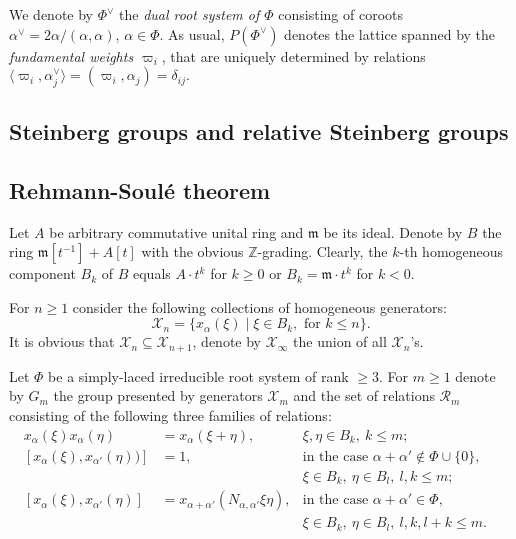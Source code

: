 \documentclass[oneside, 10pt]{amsart}
\newcommand{\XX}[1]{\mathcal{X}_{#1}}
\newcommand{\RR}[1]{\mathcal{R}_{#1}}
\numberwithin{equation}{section}
\numberwithin{lemma}{section}
\theoremstyle{definition}
\theoremstyle{remark}
\begin{document}
We denote by $\Phi^\vee$ the \emph{dual root system of $\Phi$} consisting of coroots $\alpha^\vee = 2\alpha/(\alpha, \alpha)$, $\alpha\in \Phi$.
As usual, $P(\Phi^\vee)$ denotes the lattice spanned by the \emph{fundamental weights $\varpi_i$},
 that are uniquely determined by relations $\langle\varpi_i, \alpha_j^\vee \rangle = (\varpi_i, \alpha_j) = \delta_{ij}.$ %

\subsection{Steinberg groups and relative Steinberg groups}

\subsection{Rehmann-Soul{\'e} theorem}

Let $A$ be arbitrary commutative unital ring and $\mathfrak{m}$ be its ideal.
Denote by $B$ the ring $\mathfrak{m}[t^{-1}] + A[t]$ with the obvious $\mathbb{Z}$-grading.
Clearly, the $k$-th homogeneous component $B_k$ of $B$ equals $A\cdot t^k$ for $k \geq 0$ or $B_k = \mathfrak{m} \cdot t^k$ for $k<0$.

For $n \geq 1$ consider the following collections of homogeneous generators:
\[\XX{n} = \{ x_\alpha(\xi) \mid \xi \in B_k,\text{ for } k\leq n\}. \]
It is obvious that $\XX{n} \subseteq \XX{n+1}$, denote by $\XX{\infty}$ the union of all $\XX{n}$'s.

Let $\Phi$ be a simply-laced irreducible root system of rank $\geq 3$.
For $m\geq 1$ denote by $G_m$ the group presented by generators $\mathcal{X}_m$ and the set of relations $\RR{m}$ consisting of the following
 three families of relations:
\begin{align}
 \label{eq:am} \tag{$a_m$} x_\alpha(\xi) x_\alpha(\eta) & = x_\alpha(\xi+\eta),&  \xi,\eta\in B_k,\ k\leq m;&\\
 \label{eq:bm} \tag{$b_m$} [x_\alpha(\xi), x_{\alpha'}(\eta))] &  = 1, & \text{in the case $\alpha+\alpha'\not\in\Phi\cup\{0\}$,}\\
 \nonumber                                                     &       & \xi \in B_k,\ \eta \in B_l,\ l,k\leq m;\\
 \label{eq:cm} \tag{$c_m$} [x_\alpha(\xi), x_{\alpha'}(\eta)] & = x_{\alpha+\alpha'}(N_{\alpha,\alpha'}\xi\eta), & \text{in the case $\alpha+\alpha'\in \Phi$,}\\
 \nonumber                                                    &  & \xi \in B_k,\ \eta \in B_l,\ l, k, l+k \leq m.
 \end{align}
\end{document}
